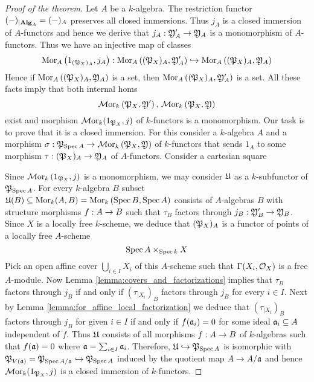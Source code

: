 \begin{proof}[Proof of the theorem]
Let $A$ be a $k$-algebra. The restriction functor $(-)_{\mid \mathbf{Alg}_A} = (-)_A$ preserves all closed immersions. Thus $j_A$ is a closed immersion of $A$-functors and hence we derive that $j_A:{\mathfrak Y}'_A\rightarrow {\mathfrak Y}_A$ is a monomorphism of $A$-functors. Thus we have an injective  map of classes
$$\mathrm{Mor}_A\left(1_{({\mathfrak P}_X)_A},j_A\right):\mathrm{Mor}_A\left(({\mathfrak P}_X)_A,{\mathfrak Y}'_A\right)\hookrightarrow \mathrm{Mor}_A\left(({\mathfrak P}_X)_A,{\mathfrak Y}_A\right)$$
Hence if $\mathrm{Mor}_A\left(({\mathfrak P}_X)_A,{\mathfrak Y}_A\right)$ is a set, then $\mathrm{Mor}_A\left(({\mathfrak P}_X)_A,{\mathfrak Y}'_A\right)$ is a set. All these facts imply that both internal homs
$$\mathcal{M}\mathrm{or}_k\left({\mathfrak P}_X,{\mathfrak Y}'\right),\,\mathcal{M}\mathrm{or}_k\left({\mathfrak P}_X,{\mathfrak Y}\right)$$
exist and morphism $\mathcal{M}\mathrm{or}_k(1_{{\mathfrak P}_X},j)$ of $k$-functors is a monomorphism. Our task is to prove that it is a closed immersion. For this consider a $k$-algebra $A$ and a morphism $\sigma:{\mathfrak P}_{\mathrm{Spec}\, A}\rightarrow \mathcal{M}\mathrm{or}_k\left({\mathfrak P}_X,{\mathfrak Y}\right)$ of $k$-functors that sends $1_A$ to some morphism $\tau:({\mathfrak P}_X)_A\rightarrow {\mathfrak Y}_A$ of $A$-functors. Consider a cartesian square
\begin{center}
\end{center}
Since $\mathcal{M}\mathrm{or}_k\left(1_{{\mathfrak P}_X},j\right)$ is a monomorphism, we may consider ${\mathfrak U}$ as a $k$-subfunctor of ${\mathfrak P}_{\mathrm{Spec}\, A}$. For every $k$-algebra $B$ subset ${\mathfrak U}(B)\subseteq \mathrm{Mor}_k(A,B)= \mathrm{Mor}_k\left(\mathrm{Spec}\, B,\mathrm{Spec}\, A\right)$ consists of $A$-algebras $B$ with structure morphisms $f:A\rightarrow B$ such that $\tau_B$ factors through $j_B:{\mathfrak Y}'_B\rightarrow {\mathfrak Y}_B$. Since $X$ is a locally free $k$-scheme, we deduce that $({\mathfrak P}_{X})_A$ is a functor of points of a locally free $A$-scheme
$$\mathrm{Spec}\, A\times_{\mathrm{Spec}\, k}X$$
Pick an open affine cover $\bigcup_{i\in I}X_i$ of this $A$-scheme such that $\Gamma(X_i,{\mathcal O}_X)$ is a free $A$-module. Now Lemma \ref{lemma:covers_and_factorizations} implies that $\tau_B$ factors through $j_B$ if and only if $\left(\tau_{\mid X_i}\right)_B$ factors through $j_B$ for every $i\in I$. Next by Lemma \ref{lemma:for_affine_local_factorization} we deduce that $\left(\tau_{\mid X_i}\right)_B$ factors through $j_B$ for given $i\in I$ if and only if $f(\mathfrak{a}_i)=0$ for some ideal $\mathfrak{a}_i\subseteq A$ independent of $f$. Thus ${\mathfrak U}$ consists of all morphisms $f:A\rightarrow B$ of $k$-algebras such that $f(\mathfrak{a})=0$ where $\mathfrak{a} = \sum_{i\in I}\mathfrak{a}_i$. Therefore, ${\mathfrak U}\hookrightarrow {\mathfrak P}_{\mathrm{Spec}\, A}$ is isomorphic with ${\mathfrak P}_{V(\mathfrak{a})} = {\mathfrak P}_{\mathrm{Spec}\, A/\mathfrak{a}}\hookrightarrow {\mathfrak P}_{\mathrm{Spec}\, A}$ induced by the quotient map $A\rightarrow A/\mathfrak{a}$ and hence $\mathcal{M}\mathrm{or}_k(1_{{\mathfrak P}_X},j)$ is a closed immersion of $k$-functors.
\end{proof}
